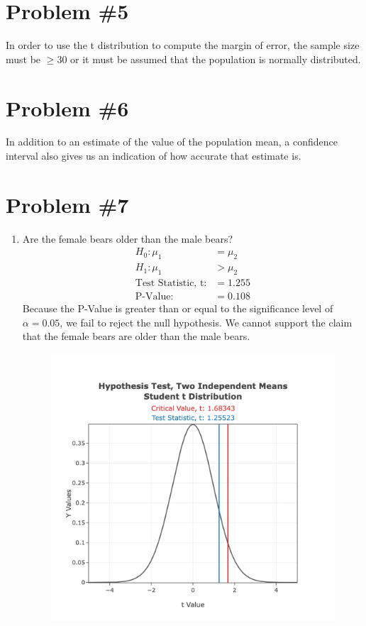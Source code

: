 \documentclass[12pt,fleqn]{article}
\newcommand{\problem}[1]{\vspace{5ex}\section*{Problem \##1}}
\begin{document}
\problem{5}
In order to use the t distribution to compute the margin of error, the sample size must be $\ge30$ or it must be assumed that the population is normally distributed.


\problem{6}
In addition to an estimate of the value of the population mean, a confidence interval also gives us an indication of how accurate that estimate is.


\problem{7}
\begin{enumerate}[label=\alph*.]


\item Are the female bears older than the male bears?
\begin{align*}
  H_0: \mu_1 &= \mu_2 \\
  H_1: \mu_1 &> \mu_2 \\
  \text{Test Statistic, t:} &= 1.255 \\
  \text{P-Value:} &= 0.108
\end{align*}
Because the P-Value is greater than or equal to the significance level of $\alpha = 0.05$, we fail to reject the null hypothesis. We cannot support the claim that the female bears are older than the male bears.
\begin{figure}[ht]
  \centering
  \includegraphics[width=12cm]{assets/bears.png}
\end{figure}



\end{enumerate}
\end{document}

